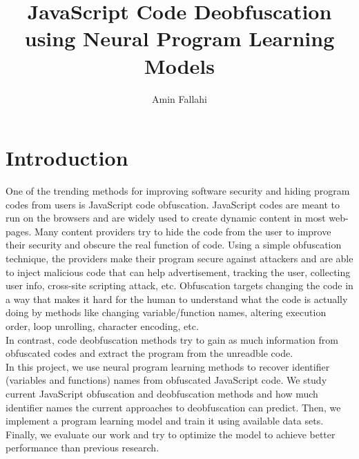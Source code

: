 \documentclass{rureport}
\author{Amin Fallahi\formatemail{afallahi@syr.edu}}  %
\title{JavaScript Code Deobfuscation using Neural Program Learning Models}  %
\begin{document}
\maketitle  %
\listoffixmes{}


\section{Introduction}
One of the trending methods for improving software security and hiding program codes from users is JavaScript code obfuscation. JavaScript codes are meant to run on the browsers and are widely used to create dynamic content in most web-pages. Many content providers try to hide the code from the user to improve their security and obscure the real function of code. Using a simple obfuscation technique, the providers make their program secure against attackers and are able to inject malicious code that can help advertisement, tracking the user, collecting user info, cross-site scripting attack, etc. Obfuscation targets changing the code in a way that makes it hard for the human to understand what the code is actually doing by methods like changing variable/function names, altering execution order, loop unrolling, character encoding, etc.\\
In contrast, code deobfuscation methods try to gain as much information from obfuscated codes and extract the program from the unreadble code.\\
In this project, we use neural program learning methods to recover identifier (variables and functions) names from obfuscated JavaScript code. We study current JavaScript obfuscation and deobfuscation methods and how much identifier names the current approaches to deobfuscation can predict. Then, we implement a program learning model and train it using available data sets. Finally, we evaluate our work and try to optimize the model to achieve better performance than previous research. 
\end{document}
